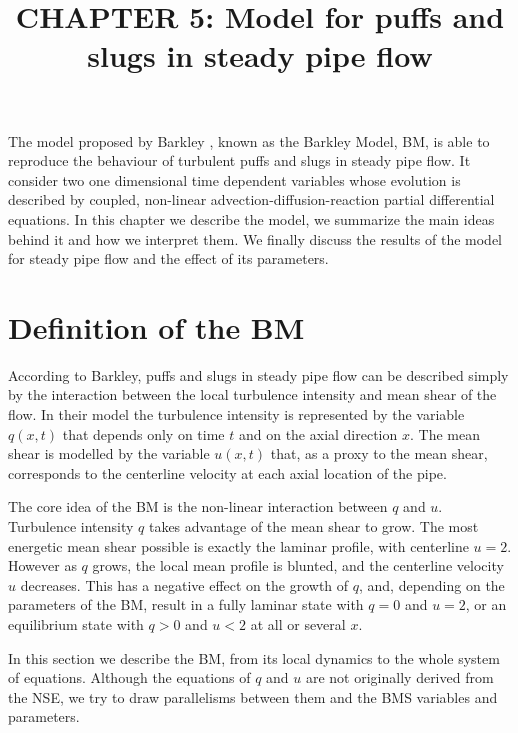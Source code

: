 \documentclass{article}
\title{CHAPTER 5: Model for puffs and slugs in steady pipe flow}
\date{}
\begin{document}
\maketitle
The model proposed by Barkley \cite{barkley2011modeling}, known as the Barkley Model, BM, is able to reproduce the behaviour of turbulent puffs and slugs in steady pipe flow. It consider two one dimensional time dependent variables whose evolution is described by coupled, non-linear advection-diffusion-reaction partial differential equations. In this chapter we describe the model, we summarize the main ideas behind it and how we interpret them. We finally discuss the results of the model for steady pipe flow and the effect of its parameters. 



\section{Definition of the BM}
According to Barkley, puffs and slugs in steady pipe flow can be described simply by the interaction between the local turbulence intensity and mean shear of the flow. In their model the turbulence intensity is represented by the variable $q \left(x,t\right)$ that depends only on time $t$ and on the axial direction $x$. The mean shear is modelled by the variable $u\left(x,t \right)$ that, as a proxy to the mean shear, corresponds to the centerline velocity at each axial location of the pipe. 

The core idea of the BM is the non-linear interaction between $q$ and $u$. Turbulence intensity $q$ takes advantage of the mean shear to grow. The most energetic mean shear possible is exactly the laminar profile, with centerline $u=2$. However as $q$ grows, the local mean profile is blunted, and the centerline velocity $u$ decreases. This has a negative effect on the growth of $q$, and, depending on the  parameters of the BM, result in a fully laminar state with $q=0$ and $u=2$, or an equilibrium state with $q>0$ and $u<2$ at all or several $x$.

In this section we describe the BM, from its local dynamics to the whole system of equations. Although the equations of $q$ and $u$ are not originally derived from the NSE, we try to draw parallelisms between them and the BMS variables and parameters.
\end{document}
